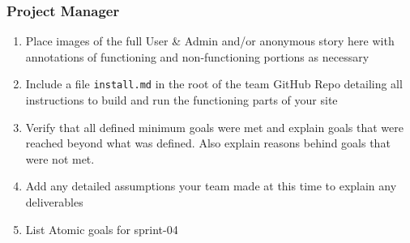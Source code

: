 \documentclass[]{article}
\providecommand{\tightlist}{%
  \setlength{\itemsep}{0pt}\setlength{\parskip}{0pt}}
\begin{document}
\hypertarget{project-manager}{%
\subsubsection{Project Manager}\label{project-manager}}

\begin{enumerate}
\def\labelenumi{\arabic{enumi}.}
\tightlist
\item
  Place images of the full User \& Admin and/or anonymous story here
  with annotations of functioning and non-functioning portions as
  necessary
\item
  Include a file \texttt{install.md} in the root of the team GitHub Repo
  detailing all instructions to build and run the functioning parts of
  your site
\item
  Verify that all defined minimum goals were met and explain goals that
  were reached beyond what was defined. Also explain reasons behind
  goals that were not met.
\item
  Add any detailed assumptions your team made at this time to explain
  any deliverables
\item
  List Atomic goals for sprint-04
\end{enumerate}
\end{document}
